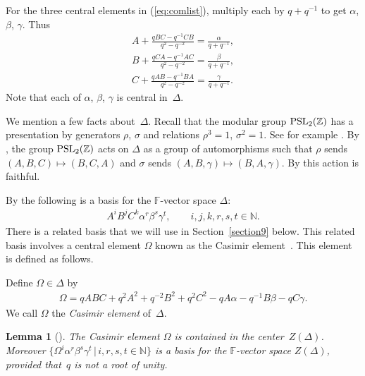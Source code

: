 \documentclass[pdftex]{sigma}
\numberwithin{equation}{section}
\newtheorem{Lemma}[Theorem]{Lemma}
\begin{document}
\begin{Definition}
\label{def:abc}
For the
three central elements in
(\ref{eq:comlist}), multiply each by $q+q^{-1}$ to get
$\alpha$, $\beta$, $\gamma$. Thus
\begin{gather}
A+ \frac{qBC-q^{-1}CB}{q^2-q^{-2}}
 =
\frac{\alpha}{q+q^{-1}},
\label{eq:u1}
\\
B+
\frac{qCA-q^{-1}AC}{q^2-q^{-2}}
 =
\frac{\beta}{q+q^{-1}},
\label{eq:u2}
\\
C+
\frac{qAB-q^{-1}BA}{q^2-q^{-2}}
 =
\frac{\gamma}{q+q^{-1}}.
\label{eq:u3}
\end{gather}
Note that each of $\alpha$, $\beta$, $\gamma$ is central in~$\Delta$.
\end{Definition}

We mention a few facts about~$\Delta$.
Recall that the modular group
${\rm  {PSL}}_2(\mathbb Z)$ has a presentation
by generators $\rho$, $\sigma$ and relations
$\rho^3=1$, $\sigma^2=1$. See for example
\cite{alpern}.
By \cite[Theorem~3.1]{uaw},
the group
${\rm  {PSL}}_2(\mathbb Z)$ acts on
$\Delta$ as a group of automorphisms
such that
$\rho$
 sends
$(A,B,C)\mapsto (B,C,A)$
and  $\sigma $
sends
$(A,B,\gamma)\mapsto (B,A,\gamma)$.
By
\cite[Theorem~3.13]{uaw}
this action is faithful.

By \cite[Theorem~4.1]{uaw} the following
is a basis for the $\mathbb F$-vector space $\Delta$:
\begin{gather*}
 A^iB^jC^k \alpha^r\beta^s\gamma^t,
\qquad
i,j,k,r,s,t \in \mathbb N.
\end{gather*}
There is a related basis
\cite[Theorem~7.5]{uaw} that we will use
 in
Section~\ref{section9} below. This related basis
involves
 a
central element $\Omega$ known as the Casimir
element~\cite[Lemma~6.1]{uaw}.
This element is def\/ined
as follows.


\begin{Definition}
\label{def:casdelta}
Def\/ine $\Omega \in \Delta$ by
\begin{gather*}
\Omega = qABC+q^2A^2+q^{-2}B^2+q^2 C^2 - q A\alpha  - q^{-1} B \beta
- q C \gamma.
\end{gather*}
We call $\Omega$ the {\it Casimir element} of~$\Delta$.
\end{Definition}

\begin{Lemma}[]
The Casimir element $\Omega$ is contained in the
center~$Z(\Delta)$.
Moreover
$\lbrace \Omega^i\alpha^r\beta^s\gamma^t \,|\, i,r,s,t \in \mathbb N\rbrace$
is a basis for
the $\mathbb F$-vector space
$Z(\Delta)$,
provided that~$q$ is not a root of unity.
\end{Lemma}
\end{document}
